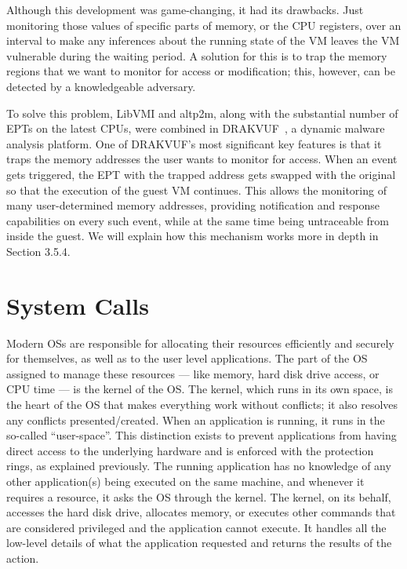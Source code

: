 \par Although this development was game-changing, it had its drawbacks. Just monitoring those values of specific parts of memory, or the \ac{CPU} registers, over an interval to make any inferences about the running state of the \ac{VM} leaves the \ac{VM} vulnerable during the waiting period. A solution for this is to trap the memory regions that we want to monitor for access or modification; this, however, can be detected by a knowledgeable adversary. 

\par To solve this problem, LibVMI and altp2m, along with the substantial number of \ac{EPT}s on the latest \ac{CPU}s, were combined in DRAKVUF~\cite{lengyel2014drakvuf}, a dynamic malware analysis platform. One of DRAKVUF's most significant key features is that it traps the memory addresses the user wants to monitor for access. When an event gets triggered, the \ac{EPT} with the trapped address gets swapped with the original so that the execution of the guest \ac{VM} continues. This allows the monitoring of many user-determined memory addresses, providing notification and response capabilities on every such event, while at the same time being untraceable from inside the guest. We will explain how this mechanism works more in depth in Section 3.5.4.


\section{System Calls}\label{sec:syscalls}
Modern \ac{OS}s are responsible for allocating their resources efficiently and securely for themselves, as well as to the user level applications. The part of the \ac{OS} assigned to manage these resources --- like memory, hard disk drive access, or \ac{CPU} time --- is the kernel of the \ac{OS}. The kernel, which runs in its own space, is the heart of the \ac{OS} that makes everything work without conflicts; it also resolves any conflicts presented/created. When an application is running, it runs in the so-called ``user-space''. This distinction exists to prevent applications from having direct access to the underlying hardware and is enforced with the protection rings, as explained previously. The running application has no knowledge of any other application(s) being executed on the same machine, and whenever it requires a resource, it asks the \ac{OS} through the kernel. The kernel, on its behalf, accesses the hard disk drive, allocates memory, or executes other commands that are considered privileged and the application cannot execute. It handles all the low-level details of what the application requested and returns the results of the action. 


